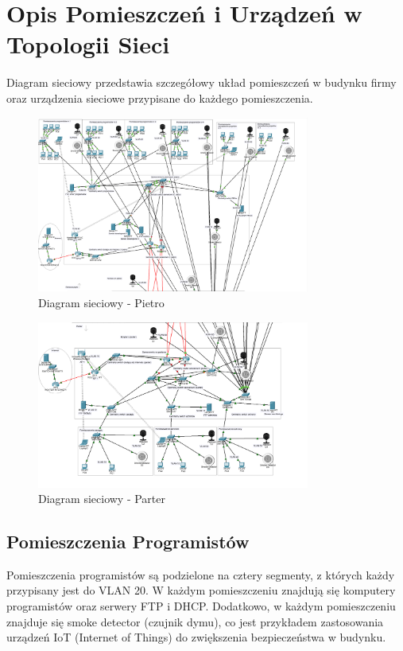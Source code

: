 \section{Opis Pomieszczeń i Urządzeń w Topologii Sieci}
Diagram sieciowy przedstawia szczegółowy układ pomieszczeń w budynku firmy oraz urządzenia sieciowe przypisane do każdego pomieszczenia.



\begin{figure}[ht]
    \centering
    \includegraphics[width=0.8\textwidth]{Pietro.png}
    \caption{Diagram sieciowy - Pietro}
    \label{fig:pietro}
\end{figure}

\begin{figure}[ht]
    \centering
    \includegraphics[width=0.8\textwidth]{Parter.png}
    \caption{Diagram sieciowy - Parter}
    \label{fig:parter}
\end{figure}

\newpage

\subsection{Pomieszczenia Programistów}
Pomieszczenia programistów są podzielone na cztery segmenty, z których każdy przypisany jest do VLAN 20. W każdym pomieszczeniu znajdują się komputery programistów oraz serwery FTP i DHCP. Dodatkowo, w każdym pomieszczeniu znajduje się smoke detector (czujnik dymu), co jest przykładem zastosowania urządzeń IoT (Internet of Things) do zwiększenia bezpieczeństwa w budynku.


